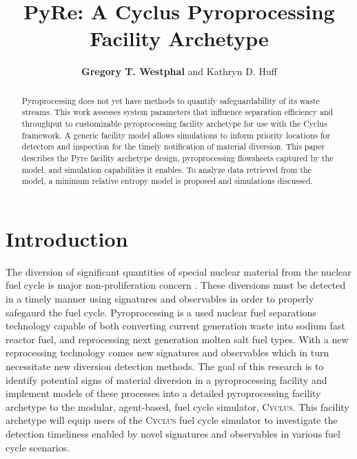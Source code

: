 \documentclass{anstrans}
\title{PyRe: A Cyclus Pyroprocessing Facility Archetype}
\author{\textbf{Gregory T. Westphal} and Kathryn D. Huff}
\institute{
Dept. of Nuclear, Plasma and Radiological Engineering, University of Illinois at Urbana-Champaign \\
gtw2@illinois.edu
}
\newcommand{\Cyclus}{\textsc{Cyclus}\xspace}%
\begin{document}
\begin{abstract}
Pyroprocessing does not yet have methods to quantify safeguardability of its waste streams. 
This work assesses system parameters that influence separation efficiency and throughput to customizable pyroprocessing facility archetype for use with the Cyclus framework.
A generic facility model allows simulations to inform priority locations for detectors and inspection for the timely notification of material diversion. 
This paper describes the Pyre facility archetype design, pyroprocessing flowsheets captured by the model, and simulation capabilities it enables. 
To analyze data retrieved from the model, a minimum relative entropy model is proposed and simulations discussed.
\end{abstract}
\section{Introduction}
The diversion of significant quantities of special nuclear material from the nuclear fuel cycle is major non-proliferation concern \cite{noauthor_iaea_2017}. These diversions must be detected in a timely manner using signatures and observables in order to properly safegaurd the fuel cycle. Pyroprocessing is a used nuclear fuel separations technology capable of both converting current generation waste into sodium fast reactor fuel, and reprocessing next generation molten salt fuel types. With a new reprocessing technology comes new signatures and observables which in turn necessitate new diversion detection methods. The goal of this research is to identify potential signs of material diversion in a pyroprocessing facility and implement models of these processes into a detailed pyroprocessing facility archetype to the modular, agent-based, fuel cycle simulator, \Cyclus \cite{huff_fundamental_2016}. This facility archetype will equip users of the \Cyclus fuel cycle simulator to investigate the detection timeliness enabled by novel signatures and observables in various fuel cycle scenarios.
\end{document}
